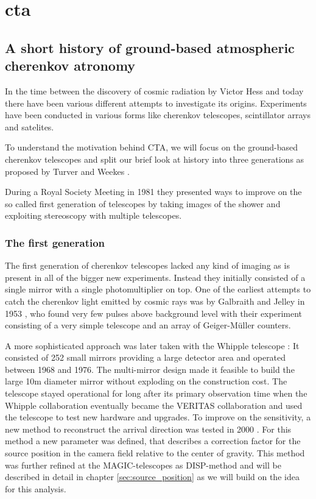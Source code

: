 \chapter{cta}
\label{cta}


\section{A short history of ground-based atmospheric cherenkov atronomy}
In the time between the discovery of cosmic radiation by Victor Hess \cite{Hess:1912srp}
and today there have been various different attempts to investigate its origins.
Experiments have been conducted in various forms like cherenkov telescopes, scintillator 
arrays and satelites.

To understand the motivation behind CTA, 
we will focus on the ground-based 
cherenkov telescopes and split our brief look at history 
into three generations as proposed by Turver and Weekes \cite{turver1980}.

During a Royal Society Meeting in 1981 they presented ways to improve on
the so called first generation of telescopes by taking images of the shower
and exploiting stereoscopy with multiple telescopes.

\subsection{The first generation}
\label{sec:1stgen_iact}
The first generation of cherenkov telescopes 
lacked any kind of imaging as is present in all of the bigger new experiments.
Instead they initially consisted of a single mirror with a single photomultiplier on top.
One of the earliest attempts to catch the cherenkov light emitted by cosmic rays 
was by Galbraith and Jelley in 1953 \cite{1953Natur.171..349G}, who found very few pulses
above background level with their experiment consisting of a very simple 
telescope and an array of Geiger-Müller counters.

A more sophisticated approach was later taken with the Whipple telescope \cite{whipple1968}:
It consisted of 252 small mirrors providing a large detector area and operated between 
1968 and 1976. The multi-mirror design made it feasible to build the large 10m diameter 
mirror without exploding on the construction cost.
The telescope stayed operational for long after its primary observation time
when the Whipple collaboration eventually became the VERITAS collaboration 
and used the telescope to test new hardware and upgrades.
To improve on the sensitivity, a new method to reconstruct 
the arrival direction was tested in 2000 \cite{Lessard:2000yf}.
For this method a new parameter was defined, that describes a correction factor 
for the source position in the camera field relative to the center of gravity.
This method was further refined at the MAGIC-telescopes as DISP-method and will be described 
in detail in chapter \ref{sec:source_position} as we will build on the idea
for this analysis.

